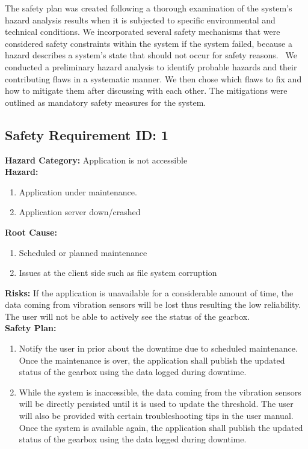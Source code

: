 \label{sec:safety}
The safety plan was created following a thorough examination of the system's hazard analysis results when it is subjected to specific environmental and technical conditions. We incorporated several safety mechanisms that were considered safety constraints within the system if the system failed, because a hazard describes a system’s state that should not occur for safety reasons.  We conducted a preliminary hazard analysis to identify probable hazards and their contributing flaws in a systematic manner. We then chose which flaws to fix and how to mitigate them after discussing with each other. The mitigations were outlined as mandatory safety measures for the system.\\

\subsection{Safety Requirement ID: 1}		
\textbf{Hazard Category:} Application is not accessible\\
\textbf{Hazard:}
\begin{enumerate}
	\item Application under maintenance.
	\item Application server down/crashed
\end{enumerate}
\textbf{Root Cause:}
\begin{enumerate}
	\item Scheduled or planned maintenance
	\item Issues at the client side such as file system corruption
\end{enumerate}
\textbf{Risks:} If the application is unavailable for a considerable amount of time, the data coming from vibration sensors will be lost thus resulting the low reliability. The user will not be able to actively see the status of the gearbox.\\
\textbf{Safety Plan:}
\begin{enumerate}
	\item Notify the user in prior about the downtime due to scheduled maintenance. Once the maintenance is over, the application shall publish the updated status of the gearbox using the data logged during downtime.
	\item While the system is inaccessible, the data coming from the vibration sensors will be directly persisted until it is used to update the threshold. The user will also be provided with certain troubleshooting tips in the user manual. Once the system is available again, the application shall publish the updated status of the gearbox using the data logged during downtime.
\end{enumerate}

